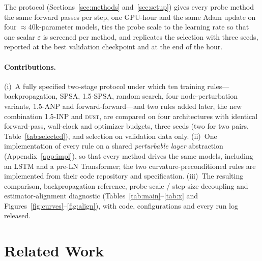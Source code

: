 \documentclass{article}
\newcommand{\method}[1]{\textsc{#1}}
\newcommand{\DUST}{\method{dust}}
\begin{document}
The protocol (Sections~\ref{sec:methods} and~\ref{sec:setup}) gives every probe method
the same forward passes per step, one GPU-hour and the same Adam update on four
$\approx$40k-parameter models, ties the probe scale to the learning rate so that one
scalar $\varepsilon$ is screened per method, and replicates the selection with three
seeds, reported at the best validation checkpoint and at the end of the hour.

\paragraph{Contributions.}
(i)~A fully specified two-stage protocol under which ten training
rules---backpropagation, SPSA, 1.5-SPSA, random search, four node-perturbation
variants, 1.5-ANP and forward-forward---and two rules added later, the new combination 1.5-INP and \DUST{}, are compared on four architectures with
identical forward-pass, wall-clock and optimizer budgets, three seeds (two for two
pairs, Table~\ref{tab:selected}), and selection on validation data only. (ii)~One implementation of every rule on a shared
\emph{perturbable layer} abstraction (Appendix~\ref{app:impl}), so that every method
drives the same models, including an LSTM and a pre-LN Transformer; the two
curvature-preconditioned rules are implemented from their code repository and
specification. (iii)~The resulting comparison, backpropagation reference, probe-scale /
step-size decoupling and estimator-alignment diagnostic (Tables~\ref{tab:main}--\ref{tab:x} and Figures~\ref{fig:curves}--\ref{fig:align}), with code, configurations and every run log
released.

\section{Related Work}
\label{sec:related}
\end{document}

